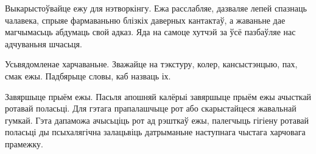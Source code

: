 Выкарыстоўвайце ежу для нэтворкінгу. Ежа расслабляе, дазваляе лепей спазнаць чалавека, спрыяе фармаваньню блізкіх даверных кантактаў, а жаваньне дае магчымасьць абдумаць свой адказ. Яда на самоце хутчэй за ўсё пазбаўляе нас адчуваньня шчасьця.

Усьвядомленае харчаваньне.
Зважайце на тэкстуру, колер, кансыстэнцыю, пах, смак ежы. Падбярыце словы, каб назваць іх.

Завяршыце прыём ежы. 
Пасьля апошняй калёрыі завяршыце прыём ежы ачысткай ротавай поласьці. Для гэтага прапалашчыце рот або скарыстайцеся жавальнай гумкай. Гэта дапаможа ачысьціць рот ад рэшткаў ежы, палегчыць гігіену ротавай поласьці ды псыхалягічна залацьвіць датрыманьне наступнага чыстага харчовага прамежку.
